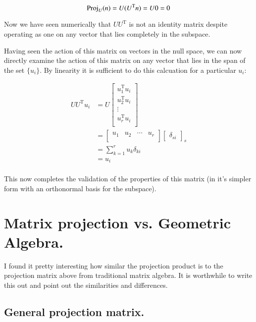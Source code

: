 \documentclass{article}      %
\newcommand{\T}[0]{\text{T}}
\begin{document}
\[
\Proj_U(n) = U (U^\T n) = U 0 = 0
\]

Now we have seen numerically that $U U^\T$ is not an identity matrix despite 
operating as one on any vector that lies completely in the subspace.

Having seen the action of this matrix on vectors in the null space, we can now
directly examine the action of this matrix on any vector that lies in the
span of the set $\{u_i\}$.  By linearity it is sufficient to do this calcuation 
for a particular $u_i$:

\begin{align*}
U U^\T u_i
&=
U
\begin{bmatrix}
u_1^\T u_i \\
u_2^\T u_i \\
\vdots \\
u_r^\T u_i \\
\end{bmatrix}
\\
&=
\begin{bmatrix}
{u_1} & {u_2} & \cdots & {u_r} \\
\end{bmatrix}
{
\begin{bmatrix}
\delta_{si}
\end{bmatrix}
}_s \\
&= \sum_{k=1}^{r} u_k \delta_{ki} \\
&= u_i \\
\end{align*}

This now completes the validation of the properties of this matrix (in it's simpler form with an orthonormal basis for the subspace).

\section{ Matrix projection vs. Geometric Algebra. }

I found it pretty interesting how similar the projection product is to the projection matrix above from traditional matrix algebra.  It is worthwhile
to write this out and point out the similarities and differences.

\subsection{ General projection matrix. }
\end{document}
